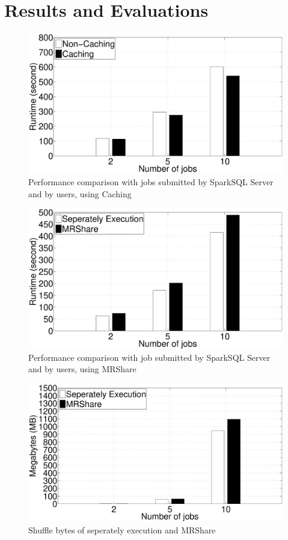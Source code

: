
\section{Results and Evaluations}
\begin{figure}
\includegraphics[width=\textwidth]{Figures/caching-vs-non-caching.eps}
\caption{Performance comparison with jobs submitted by SparkSQL Server and by users, using Caching}
\label{fig:caching}
\end{figure}

\begin{figure}
\includegraphics[width=\textwidth]{Figures/multi-mrshare.eps}
\caption{Performance comparison with job submitted by SparkSQL Server and by users, using MRShare}
\label{fig:mrshare}
\end{figure}

\begin{figure}
\includegraphics[width=\textwidth]{Figures/shuffle.eps}
\caption{Shuffle bytes of seperately execution and MRShare}
\label{fig:shuffle}
\end{figure}

